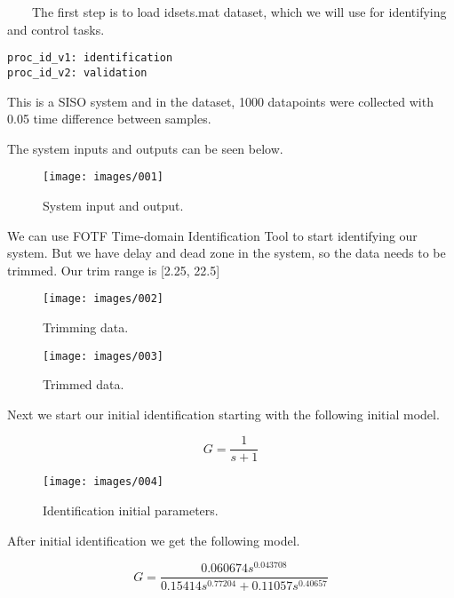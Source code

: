 \documentclass[12pt,a4paper]{article}
\begin{document}
\ \ \ \ The first step is to load idsets.mat dataset, which we will use for identifying and control tasks.

\begin{verbatim}
proc_id_v1: identification
proc_id_v2: validation
\end{verbatim}

This is a SISO system and in the dataset, 1000 datapoints were collected with 0.05 time difference between samples.

The system inputs and outputs can be seen below.

\begin{figure}[h]
	\caption{System input and output.}
	\texttt{[image: images/001]}
	\centering
\end{figure}

\FloatBarrier

We can use FOTF Time-domain Identification Tool to start identifying our system. But we have delay and dead zone in the system, so the data needs to be trimmed. Our trim range is [2.25, 22.5]

\begin{figure}[h]
	\caption{Trimming data.}
	\texttt{[image: images/002]}
	\centering
\end{figure}

\FloatBarrier

\begin{figure}[h]
	\caption{Trimmed data.}
	\texttt{[image: images/003]}
	\centering
\end{figure}

\FloatBarrier

Next we start our initial identification starting with the following initial model.

\begin{equation}
G = \frac{1}{s + 1}
\end{equation}

\begin{figure}[h]
	\caption{Identification initial parameters.}
	\texttt{[image: images/004]}
	\centering
\end{figure}

\FloatBarrier

After initial identification we get the following model.

\begin{equation}
G = \frac{0.060674s^{0.043708}}{0.15414s^{0.77204}+0.11057s^{0.40657}}
\end{equation}
\end{document}
